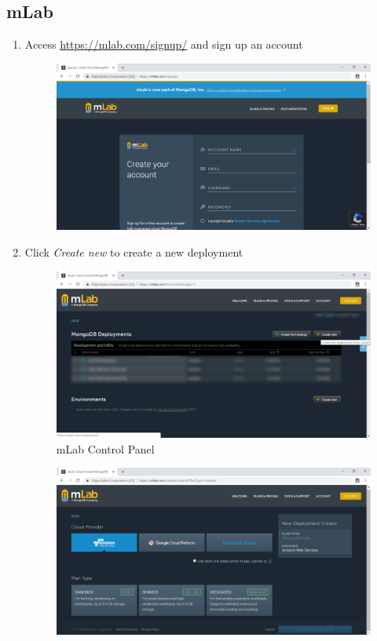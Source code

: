 \tocless\subsection{mLab}
\begin{enumerate}
	\item Access \href{https://mlab.com/signup/}{https://mlab.com/signup/} and sign up an account
	      \begin{center}
	      	\begin{figure}[H]
	      		\centering
	      		\includegraphics[width=0.6\columnwidth]{images/appendixA/mLab-sign-up.PNG}
	      	\end{figure}
	      \end{center}
	\item Click \textit{Create new} to create a new deployment
	      \begin{center}
	      	\begin{figure}[H]
	      		\centering
	      		\includegraphics[width=0.6\columnwidth]{images/appendixA/mLab-create-deployment.png}
	      		\caption{mLab Control Panel}
	      	\end{figure}
	      \end{center}
	      \begin{center}
	      	\begin{figure}[H]
	      		\centering
	      		\includegraphics[width=0.6\columnwidth]{images/appendixA/mLab-create-deployment-2.PNG}

\end{figure}
\end{center}
\end{enumerate}
